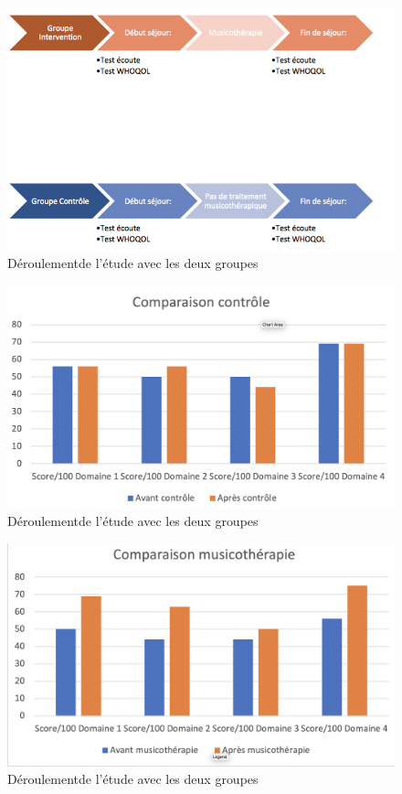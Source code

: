 \begin{figure}
\centering
\includegraphics[width=0.7\linewidth]{images/Groupecontrole.png}
\caption[Schéma du déroulement]{Déroulementde l'étude avec les
         deux groupes}
       
\label{groupecontroleimage1}
\end{figure}

\begin{figure}
\centering
\includegraphics[width=0.7\linewidth]{images/Compcontrole.png}
\caption[Schéma du déroulement]{Déroulementde l'étude avec les
         deux groupes}
       
\label{groupecontroleimage1}
\end{figure}

\begin{figure}
\centering
\includegraphics[width=0.7\linewidth]{images/Compmusico.png}
\caption[Schéma du déroulement]{Déroulementde l'étude avec les
         deux groupes}
       
\label{groupecontroleimage1}
\end{figure}



